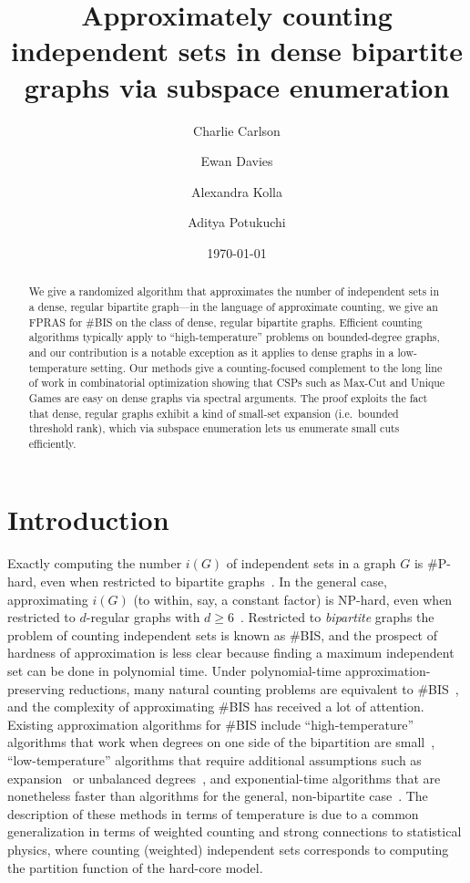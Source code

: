 \documentclass[11pt,letterpaper]{amsart}
\title[Approximately counting independent sets in dense bipartite graphs]{Approximately counting independent sets in dense bipartite graphs via subspace enumeration}
\date{\today}
\author[C.\ Carlson]{Charlie Carlson}
\author[E.\ Davies]{Ewan Davies}
\author[A.\ Kolla]{Alexandra Kolla}
\author[A.\ Potukuchi]{Aditya Potukuchi}
\theoremstyle{definition}
\begin{document}
\begin{abstract}
We give a randomized algorithm that approximates the number of independent sets in a dense, regular bipartite graph---in the language of approximate counting, we give an FPRAS for \#BIS on the class of dense, regular bipartite graphs. 
Efficient counting algorithms typically apply to ``high-temperature'' problems on bounded-degree graphs, and our contribution is a notable exception as it applies to dense graphs in a low-temperature setting. 
Our methods give a counting-focused complement to the long line of work in combinatorial optimization showing that CSPs such as Max-Cut and Unique Games are easy on dense graphs via spectral arguments. The proof exploits the fact that dense, regular graphs exhibit a kind of small-set expansion (i.e.\ bounded threshold rank), which via subspace enumeration lets us enumerate small cuts efficiently.
\end{abstract}


\section{Introduction}

Exactly computing the number $i(G)$ of independent sets in a graph $G$ is \#P-hard, even when restricted to bipartite graphs~\cite{PB83}. In the general case, approximating $i(G)$ (to within, say, a constant factor) is NP-hard, even when restricted to $d$-regular graphs with $d\ge 6$~\cite{GGS+11,Sly10,SS12}.
Restricted to \emph{bipartite} graphs the problem of counting independent sets is known as \#BIS, and the prospect of hardness of approximation is less clear because finding a maximum independent set can be done in polynomial time.
Under polynomial-time approximation-preserving reductions, many natural counting problems are equivalent to \#BIS~\cite{DGGJ04}, and the complexity of approximating \#BIS has received a lot of attention. 
Existing approximation algorithms for \#BIS include ``high-temperature'' algorithms that work when degrees on one side of the bipartition are small~\cite{LL15}, ``low-temperature'' algorithms that require additional assumptions such as expansion~\cite{CGG+19,JKP19b} or unbalanced degrees~\cite{CPSODA}, and exponential-time algorithms that are nonetheless faster than algorithms for the general, non-bipartite case~\cite{GLR21}.
The description of these methods in terms of temperature is due to a common generalization in terms of weighted counting and strong connections to statistical physics, where counting (weighted) independent sets corresponds to computing the partition function of the hard-core model.
\end{document}
